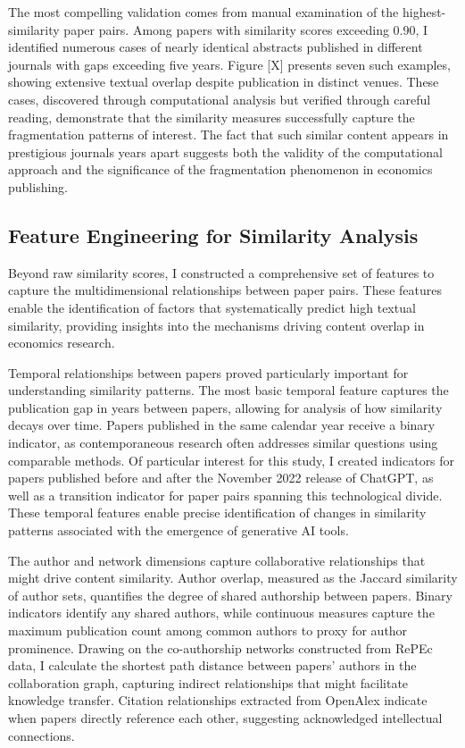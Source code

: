 \documentclass[12pt]{article}
\begin{document}
The most compelling validation comes from manual examination of the highest-similarity paper pairs. Among papers with similarity scores exceeding 0.90, I identified numerous cases of nearly identical abstracts published in different journals with gaps exceeding five years. Figure [X] presents seven such examples, showing extensive textual overlap despite publication in distinct venues. These cases, discovered through computational analysis but verified through careful reading, demonstrate that the similarity measures successfully capture the fragmentation patterns of interest. The fact that such similar content appears in prestigious journals years apart suggests both the validity of the computational approach and the significance of the fragmentation phenomenon in economics publishing.

\subsection{Feature Engineering for Similarity Analysis}

Beyond raw similarity scores, I constructed a comprehensive set of features to capture the multidimensional relationships between paper pairs. These features enable the identification of factors that systematically predict high textual similarity, providing insights into the mechanisms driving content overlap in economics research.

Temporal relationships between papers proved particularly important for understanding similarity patterns. The most basic temporal feature captures the publication gap in years between papers, allowing for analysis of how similarity decays over time. Papers published in the same calendar year receive a binary indicator, as contemporaneous research often addresses similar questions using comparable methods. Of particular interest for this study, I created indicators for papers published before and after the November 2022 release of ChatGPT, as well as a transition indicator for paper pairs spanning this technological divide. These temporal features enable precise identification of changes in similarity patterns associated with the emergence of generative AI tools.

The author and network dimensions capture collaborative relationships that might drive content similarity. Author overlap, measured as the Jaccard similarity of author sets, quantifies the degree of shared authorship between papers. Binary indicators identify any shared authors, while continuous measures capture the maximum publication count among common authors to proxy for author prominence. Drawing on the co-authorship networks constructed from RePEc data, I calculate the shortest path distance between papers' authors in the collaboration graph, capturing indirect relationships that might facilitate knowledge transfer. Citation relationships extracted from OpenAlex indicate when papers directly reference each other, suggesting acknowledged intellectual connections.
\end{document}
